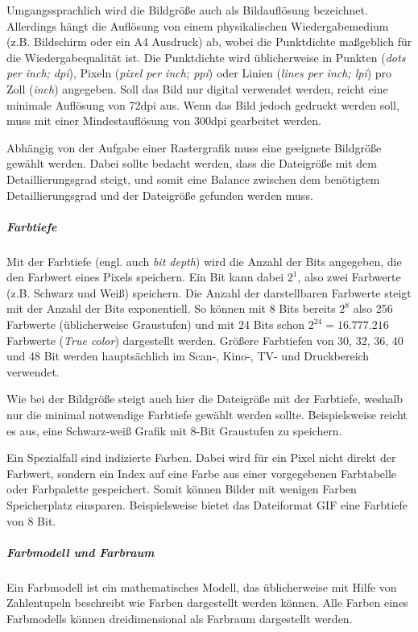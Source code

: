 Umgangssprachlich wird die Bildgröße auch als Bildauflösung bezeichnet. Allerdings hängt die Auflösung von einem physikalischen Wiedergabemedium (z.B. Bildschirm oder ein A4 Ausdruck) ab, wobei die Punktdichte maßgeblich für die Wiedergabequalität ist. Die Punktdichte wird üblicherweise in Punkten (\emph{dots per inch; dpi}), Pixeln (\emph{pixel per inch; ppi}) oder Linien (\emph{lines per inch; lpi}) pro Zoll (\emph{inch}) angegeben. Soll das Bild nur digital verwendet werden, reicht eine minimale Auflösung von 72dpi aus. Wenn das Bild jedoch gedruckt werden soll, muss mit einer Mindestauflösung von 300dpi gearbeitet werden.

Abhängig von der Aufgabe einer Rastergrafik muss eine geeignete Bildgröße gewählt werden. Dabei sollte bedacht werden, dass die Dateigröße mit dem Detaillierungsgrad steigt, und somit eine Balance zwischen dem benötigtem Detaillierungsgrad und der Dateigröße gefunden werden muss.


\label{RG_Farbtiefe}
\subparagraph{Farbtiefe} Mit der Farbtiefe (engl. auch \emph{bit depth}) wird die Anzahl der Bits angegeben, die den Farbwert eines Pixels speichern. Ein Bit kann dabei $2^1$, also zwei Farbwerte (z.B. Schwarz und Weiß) speichern. Die Anzahl der darstellbaren Farbwerte steigt mit der Anzahl der Bits exponentiell. So können mit 8 Bits bereits $2^8$ also 256 Farbwerte (üblicherweise Graustufen) und mit 24 Bits schon $2^{24} = 16.777.216$ Farbwerte (\emph{True color}) dargestellt werden. Größere Farbtiefen von 30, 32, 36, 40 und 48 Bit werden hauptsächlich im Scan-, Kino-, TV- und Druckbereich verwendet.

Wie bei der Bildgröße steigt auch hier die Dateigröße mit der Farbtiefe, weshalb nur die minimal notwendige Farbtiefe gewählt werden sollte. Beispielsweise reicht es aus, eine Schwarz-weiß Grafik mit 8-Bit Graustufen zu speichern.

Ein Spezialfall sind indizierte Farben. Dabei wird für ein Pixel nicht direkt der Farbwert, sondern ein Index auf eine Farbe aus einer vorgegebenen Farbtabelle oder Farbpalette gespeichert. Somit können Bilder mit wenigen Farben Speicherplatz einsparen. Beispielsweise bietet das Dateiformat GIF eine Farbtiefe von 8 Bit.

\label{RG_Farbmodell}
\subparagraph{Farbmodell und Farbraum} Ein Farbmodell ist ein mathematisches Modell, das üblicherweise mit Hilfe von Zahlentupeln beschreibt wie Farben dargestellt werden können. Alle Farben eines Farbmodells können dreidimensional als Farbraum dargestellt werden.

